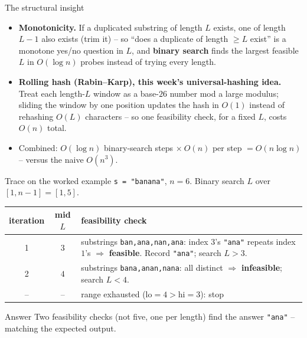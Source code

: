 \documentclass[11pt,aspectratio=169]{beamer}
\begin{document}
\begin{frame}{The structural insight}
  \begin{itemize}
    \item \textbf{Monotonicity.} If a duplicated substring of length $L$ exists, one of
    length $L-1$ also exists (trim it) -- so ``does a duplicate of length $\ge L$
    exist'' is a monotone yes/no question in $L$, and \textbf{binary search} finds the
    largest feasible $L$ in $O(\log n)$ probes instead of trying every length.
    \item \textbf{Rolling hash (Rabin--Karp), this week's universal-hashing idea.}
    Treat each length-$L$ window as a base-$26$ number mod a large modulus; sliding the
    window by one position updates the hash in $O(1)$ instead of rehashing $O(L)$
    characters -- so one feasibility check, for a fixed $L$, costs $O(n)$ total.
    \item Combined: $O(\log n)$ binary-search steps $\times\ O(n)$ per step
    $= O(n\log n)$ -- versus the naive $O(n^3)$.
  \end{itemize}
\end{frame}

\begin{frame}{Trace on the worked example}
  \scriptsize
  \texttt{s = "banana"}, $n=6$. Binary search $L$ over $[1, n-1] = [1,5]$.
  \begin{center}
  \begin{tabular}{@{}c c p{7.2cm}@{}}
    \toprule
    iteration & mid $L$ & feasibility check \\
    \midrule
    1 & $3$ & substrings \texttt{ban,ana,nan,ana}: index $3$'s \texttt{"ana"} repeats
    index $1$'s $\Rightarrow$ \textbf{feasible}. Record \texttt{"ana"}; search $L>3$. \\
    2 & $4$ & substrings \texttt{bana,anan,nana}: all distinct $\Rightarrow$
    \textbf{infeasible}; search $L<4$. \\
    -- & -- & range exhausted (lo$=4>$hi$=3$): stop \\
    \bottomrule
  \end{tabular}
  \end{center}
  \begin{exampleblock}{Answer}
    Two feasibility checks (not five, one per length) find the answer \texttt{"ana"} --
    matching the expected output.
  \end{exampleblock}
\end{frame}
\end{document}
